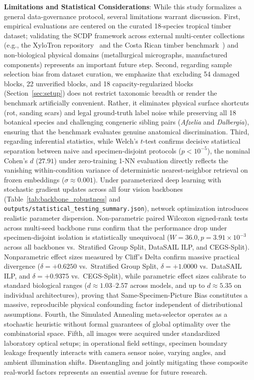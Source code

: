 \documentclass[a4paper,fleqn]{cas-sc}
\begin{document}
\textbf{Limitations and Statistical Considerations}: While this study formalizes a general data-governance protocol, several limitations warrant discussion. First, empirical evaluations are centered on the curated 18-species tropical timber dataset; validating the SCDP framework across external multi-center collections (e.g., the XyloTron repository~\cite{ravindran2020} and the Costa Rican timber benchmark~\cite{figueroamata2022}) and non-biological physical domains (metallurgical micrographs, manufactured components) represents an important future step. Second, regarding sample selection bias from dataset curation, we emphasize that excluding 54 damaged blocks, 22 unverified blocks, and 18 capacity-regularized blocks (Section~\ref{sec:setup}) does not restrict taxonomic breadth or render the benchmark artificially convenient. Rather, it eliminates physical surface shortcuts (rot, sanding scars) and legal ground-truth label noise while preserving all 18 botanical species and challenging congeneric sibling pairs (\textit{Afzelia} and \textit{Dalbergia}), ensuring that the benchmark evaluates genuine anatomical discrimination. Third, regarding inferential statistics, while Welch's $t$-test confirms decisive statistical separation between naive and specimen-disjoint protocols ($p < 10^{-5}$), the nominal Cohen's $d$ ($27.91$) under zero-training 1-NN evaluation directly reflects the vanishing within-condition variance of deterministic nearest-neighbor retrieval on frozen embeddings ($\sigma \approx 0.001$). Under parameterized deep learning with stochastic gradient updates across all four vision backbones (Table~\ref{tab:backbone_robustness} and \texttt{outputs/statistical\_testing\_summary.json}), network optimization introduces realistic parameter dispersion. Non-parametric paired Wilcoxon signed-rank tests across multi-seed backbone runs confirm that the performance drop under specimen-disjoint isolation is statistically unequivocal ($W = 36.0, p = 3.91 \times 10^{-3}$ across all backbones vs.\ Stratified Group Split, DataSAIL ILP, and CEGS-Split). Nonparametric effect sizes measured by Cliff's Delta confirm massive practical divergence ($\delta = +0.6250$ vs.\ Stratified Group Split, $\delta = +1.0000$ vs.\ DataSAIL ILP, and $\delta = +0.9375$ vs.\ CEGS-Split), while parametric effect sizes calibrate to standard biological ranges ($d \approx 1.03$--$2.57$ across models, and up to $d \approx 5.35$ on individual architectures), proving that Same-Specimen-Picture Bias constitutes a massive, reproducible physical confounding factor independent of distributional assumptions. Fourth, the Simulated Annealing meta-selector operates as a stochastic heuristic without formal guarantees of global optimality over the combinatorial space. Fifth, all images were acquired under standardized laboratory optical setups; in operational field settings, specimen boundary leakage frequently interacts with camera sensor noise, varying angles, and ambient illumination shifts. Disentangling and jointly mitigating these composite real-world factors represents an essential avenue for future research.
\end{document}
